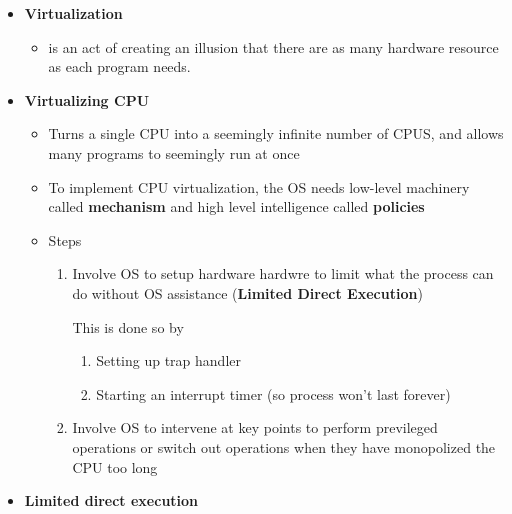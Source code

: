 \documentclass[12pt]{article}
\begin{document}
\begin{itemize}
    \item \textbf{Virtualization}

    \begin{itemize}
        \item is an act of creating an illusion that there are as many hardware resource as each program needs.
    \end{itemize}

    \item \textbf{Virtualizing CPU}

    \begin{itemize}
        \item Turns a single CPU into a seemingly infinite number of CPUS, and
        allows many programs to seemingly run at once
        \item To implement CPU virtualization, the OS needs low-level machinery
        called \textbf{mechanism} and high level intelligence called \textbf{policies}
        \item Steps

        \begin{enumerate}[1.]
            \item Involve OS to setup hardware hardwre to limit what the process can do without OS assistance
            (\textbf{Limited Direct Execution})

            \bigskip

            This is done so by

            \bigskip

            \begin{enumerate}[1.]
                \item Setting up trap handler
                \item Starting an interrupt timer (so process won't last forever)
            \end{enumerate}
            \item Involve OS to intervene at key points to perform previleged operations
            or switch out operations when they have monopolized the CPU too long
        \end{enumerate}
        \bigskip
    \end{itemize}

    \item \textbf{Limited direct execution}


\end{itemize}
\end{document}
